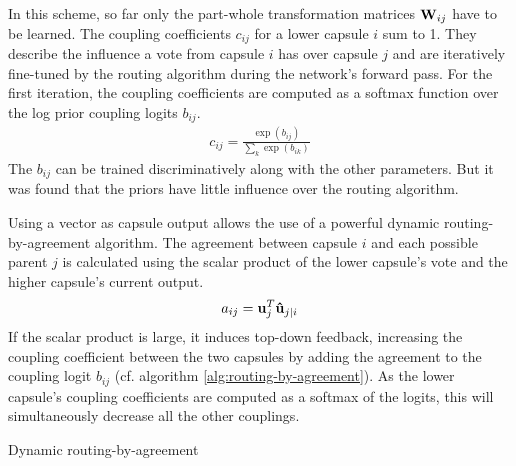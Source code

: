 In this scheme, so far only the part-whole transformation matrices $\vb{W}_{ij}$ have to be learned. The coupling coefficients $c_{ij}$ for a lower capsule $i$ sum to 1. They describe the influence a vote from capsule $i$ has over capsule $j$ and are iteratively fine-tuned by the routing algorithm during the network's forward pass. For the first iteration, the coupling coefficients are computed as a softmax function over the log prior coupling logits $b_{ij}$.
\begin{align}
    c_{ij} = \frac{\exp(b_{ij})}{\sum_k \exp(b_{ik})}
    \label{eq:coupling-coeff}
\end{align}
The $b_{ij}$ can be trained discriminatively along with the other parameters. But it was found that the priors have little influence over the routing algorithm.

Using a vector as capsule output allows the use of a powerful dynamic routing-by-agreement algorithm. The agreement between capsule $i$ and each possible parent $j$ is calculated using the scalar product of the lower capsule's vote and the higher capsule's current output.
\begin{align}
    a_{ij} = \vb{u}_j^T \vb{\hat{u}}_{j|i}
\end{align}
If the scalar product is large, it induces top-down feedback, increasing the coupling coefficient between the two capsules by adding the agreement to the coupling logit $b_{ij}$ (cf. algorithm \ref{alg:routing-by-agreement}). As the lower capsule's coupling coefficients are computed as a softmax of the logits, this will simultaneously decrease all the other couplings.
\begin{algorithm}
\caption{Dynamic routing-by-agreement}\label{alg:routing-by-agreement}
\begin{algorithmic}[1]
\EndFor
{}
  \EndFor
  \EndFor
  \EndFor
  \EndFor
\EndFor
{}
\EndProcedure
\end{algorithmic}
\end{algorithm}

